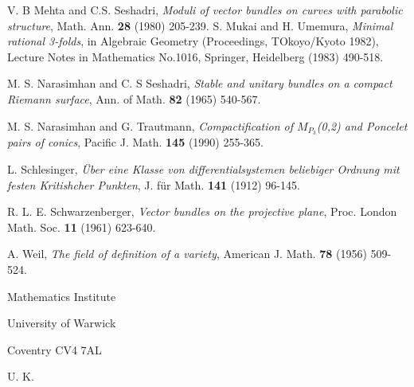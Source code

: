 \begin{thebibliography}{99}
 V. B Mehta and C.S. Seshadri, \textit{Moduli of vector bundles on curves with parabolic structure}, Math. Ann. {\bf 28} (1980) 205-239.
 S. Mukai and H. Umemura, \textit{Minimal rational 3-folds}, in Algebraic Geometry (Proceedings, TOkoyo/Kyoto 1982), Lecture Notes in Mathematics No.1016, Springer, Heidelberg (1983) 490-518.

 M. S. Narasimhan and C. S Seshadri, \textit{Stable and unitary bundles on a compact Riemann surface}, Ann. of Math. {\bf 82} (1965) 540-567.

 M. S. Narasimhan and G. Trautmann, \textit{Compactification of $M_{P_{3}}$(0,2) and Poncelet pairs of conics}, Pacific J. Math. {\bf 145} (1990) 255-365.
 
 L. Schlesinger, \textit{\"Uber eine Klasse von differentialsystemen beliebiger Ordnung mit festen Kritishcher Punkten}, J. f\"ur Math. {\bf 141} (1912) 96-145.

 R. L. E. Schwarzenberger, \textit{Vector bundles on the projective plane}, Proc. London Math. Soc. {\bf 11} (1961) 623-640.

A. Weil, \textit{The field of definition of a variety}, American J. Math. {\bf 78} (1956) 509-524.
\end{thebibliography}

\begin{flushleft}
Mathematics Institute

University of Warwick

Coventry CV4 7AL

U. K.
\end{flushleft}

